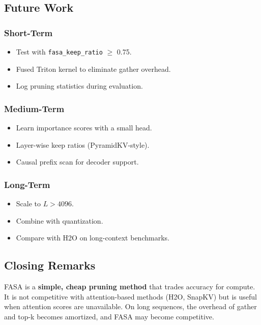 \subsection{Future Work}

\subsubsection{Short-Term}

\begin{itemize}
\item Test with \texttt{fasa\_keep\_ratio} $\ge$ 0.75.
\item Fused Triton kernel to eliminate gather overhead.
\item Log pruning statistics during evaluation.

\end{itemize}
\subsubsection{Medium-Term}

\begin{itemize}
\item Learn importance scores with a small head.
\item Layer-wise keep ratios (PyramidKV-style).
\item Causal prefix scan for decoder support.

\end{itemize}
\subsubsection{Long-Term}

\begin{itemize}
\item Scale to $L > 4096$.
\item Combine with quantization.
\item Compare with H2O on long-context benchmarks.

\end{itemize}
\subsection{Closing Remarks}

FASA is a \textbf{simple, cheap pruning method} that trades accuracy for 
compute. It is not competitive with attention-based methods (H2O, SnapKV) 
but is useful when attention scores are unavailable. On long sequences, 
the overhead of gather and top-k becomes amortized, and FASA may become 
competitive.

